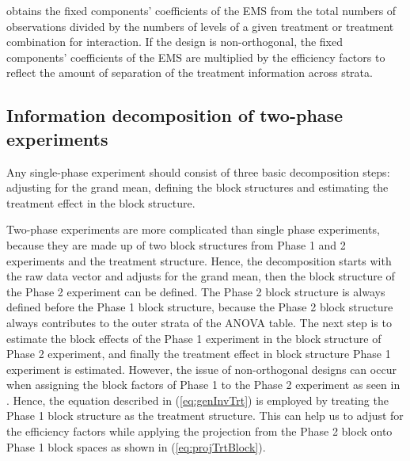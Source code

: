 \documentclass[article]{jss}
\begin{document}
 obtains the fixed components' coefficients of the EMS from the total numbers of observations divided by the numbers of levels of a given treatment or treatment combination for interaction. If the design is non-orthogonal, the fixed components' coefficients of the EMS are multiplied by the efficiency factors to reflect the amount of separation of the treatment information across strata.

\subsection{Information decomposition of two-phase experiments}\label{subsec:infoTwoPhase}
Any single-phase experiment should consist of three basic decomposition steps: adjusting for the grand mean, defining the block structures and estimating the treatment effect in the block structure.

Two-phase experiments are more complicated than single phase experiments, because they are made up of two block structures from Phase 1 and 2 experiments and the treatment structure. Hence, the decomposition starts with the raw data vector and adjusts for the grand mean, then the block structure of the Phase 2 experiment can be defined. The Phase 2 block structure is always defined before the Phase 1 block structure, because the Phase 2 block structure always contributes to the outer strata of the ANOVA table. The next step is to estimate the block effects of the Phase 1 experiment in the block structure of Phase 2 experiment, and finally the treatment effect in block structure Phase 1 experiment is estimated. However, the issue of non-orthogonal designs can occur when assigning the block factors of Phase 1 to the Phase 2 experiment as seen in \cite{Brien1999}. Hence, the equation described in (\ref{eq:genInvTrt}) is employed by treating the Phase 1 block structure as the treatment structure. This can help us to adjust for the efficiency factors while applying the projection from the Phase 2 block onto Phase 1 block spaces as shown in (\ref{eq:projTrtBlock}).
\end{document}
